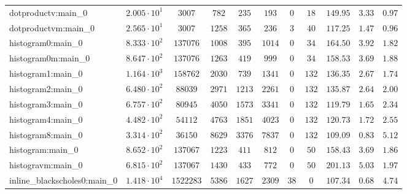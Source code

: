 \begin{tabular}{|l|c|c|c|c|c|c|c|c|c|c|}
dotproductv:main\_0            & $ 2.005 \cdot 10^{1} $ & $ 3007     $ & $ 782    $ & $ 235    $ & $ 193    $ & $ 0    $ & $ 18   $ & $ 149.95      $ & $ 3.33    $ & $ 0.97    $ \\
dotproductvm:main\_0           & $ 2.565 \cdot 10^{1} $ & $ 3007     $ & $ 1258   $ & $ 365    $ & $ 236    $ & $ 3    $ & $ 40   $ & $ 117.25      $ & $ 1.47    $ & $ 0.96    $ \\
histogram0:main\_0             & $ 8.333 \cdot 10^{2} $ & $ 137076   $ & $ 1008   $ & $ 395    $ & $ 1014   $ & $ 0    $ & $ 34   $ & $ 164.50      $ & $ 3.92    $ & $ 1.82    $ \\
histogram0m:main\_0            & $ 8.647 \cdot 10^{2} $ & $ 137076   $ & $ 1263   $ & $ 419    $ & $ 999    $ & $ 0    $ & $ 34   $ & $ 158.53      $ & $ 3.69    $ & $ 1.88    $ \\
histogram1:main\_0             & $ 1.164 \cdot 10^{3} $ & $ 158762   $ & $ 2030   $ & $ 739    $ & $ 1341   $ & $ 0    $ & $ 132  $ & $ 136.35      $ & $ 2.67    $ & $ 1.74    $ \\
histogram2:main\_0             & $ 6.480 \cdot 10^{2} $ & $ 88039    $ & $ 2971   $ & $ 1213   $ & $ 2261   $ & $ 0    $ & $ 132  $ & $ 135.87      $ & $ 2.64    $ & $ 2.00    $ \\
histogram3:main\_0             & $ 6.757 \cdot 10^{2} $ & $ 80945    $ & $ 4050   $ & $ 1573   $ & $ 3341   $ & $ 0    $ & $ 132  $ & $ 119.79      $ & $ 1.65    $ & $ 2.34    $ \\
histogram4:main\_0             & $ 4.482 \cdot 10^{2} $ & $ 54112    $ & $ 4763   $ & $ 1851   $ & $ 4023   $ & $ 0    $ & $ 132  $ & $ 120.73      $ & $ 1.72    $ & $ 2.55    $ \\
histogram8:main\_0             & $ 3.314 \cdot 10^{2} $ & $ 36150    $ & $ 8629   $ & $ 3376   $ & $ 7837   $ & $ 0    $ & $ 132  $ & $ 109.09      $ & $ 0.83    $ & $ 5.12    $ \\
histogram:main\_0              & $ 8.652 \cdot 10^{2} $ & $ 137067   $ & $ 1223   $ & $ 411    $ & $ 812    $ & $ 0    $ & $ 50   $ & $ 158.43      $ & $ 3.69    $ & $ 1.86    $ \\
histogravm:main\_0             & $ 6.815 \cdot 10^{2} $ & $ 137067   $ & $ 1430   $ & $ 433    $ & $ 772    $ & $ 0    $ & $ 50   $ & $ 201.13      $ & $ 5.03    $ & $ 1.97    $ \\
inline\_blackscholes0:main\_0  & $ 1.418 \cdot 10^{4} $ & $ 1522283  $ & $ 5386   $ & $ 1627   $ & $ 2309   $ & $ 38   $ & $ 0    $ & $ 107.34      $ & $ 0.68    $ & $ 4.74    $ \\

\end{tabular}
